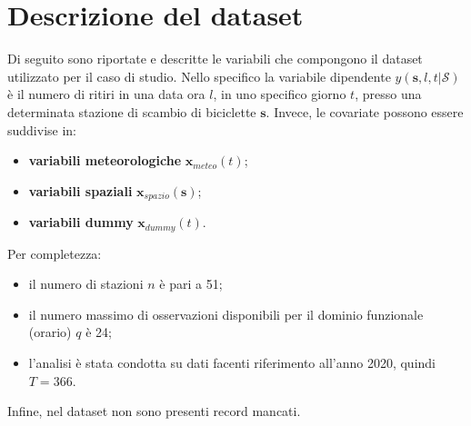 \section[Descrizione del dataset]{Descrizione del dataset}
Di seguito sono riportate e descritte le variabili che compongono il dataset utilizzato per il caso di studio. Nello specifico la variabile dipendente $y(\mathbf{s}, l, t|\mathcal{S})$ è il numero di ritiri in una data ora $l$, in uno specifico giorno $t$, presso una determinata stazione di scambio di biciclette $\mathbf{s}$. Invece, le covariate possono essere suddivise in:
\begin{itemize}
	\item \textbf{variabili meteorologiche} $\mathbf{x}_{meteo}(t)$;
	\item \textbf{variabili spaziali} $\mathbf{x}_{spazio}(\mathbf{s})$;
	\item \textbf{variabili dummy} $\mathbf{x}_{dummy}(t)$.
\end{itemize}
Per completezza:
\begin{itemize}
	\item il numero di stazioni $n$ è pari a \num{51};
	\item il numero massimo di osservazioni disponibili per il dominio funzionale (orario) $q$ è \num{24};
	\item l'analisi è stata condotta su dati facenti riferimento all'anno \num{2020}, quindi $T=366$.
\end{itemize}
Infine, nel dataset non sono presenti record mancati.


